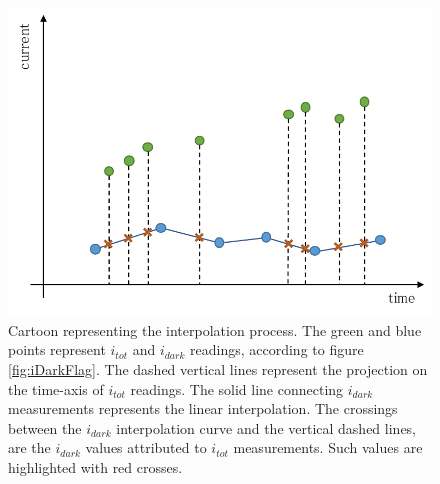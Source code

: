 \begin{figure}[!t]
\begin{center}
\includegraphics[width=0.8\linewidth]{Chapters/Performance/Figs/interpolation.pdf}
\caption{Cartoon representing the interpolation process.
The green and blue points represent $i_{tot}$ and $i_{dark}$ readings, according to figure \ref{fig:iDarkFlag}.
The dashed vertical lines represent the projection on the time-axis of $i_{tot}$ readings.
The solid line connecting $i_{dark}$ measurements represents the linear interpolation.
The crossings between the $i_{dark}$ interpolation curve and the vertical dashed lines, are the $i_{dark}$ values attributed to $i_{tot}$ measurements.
Such values are highlighted with red crosses.}
\label{fig:interpolation}
\end{center}
\end{figure}

